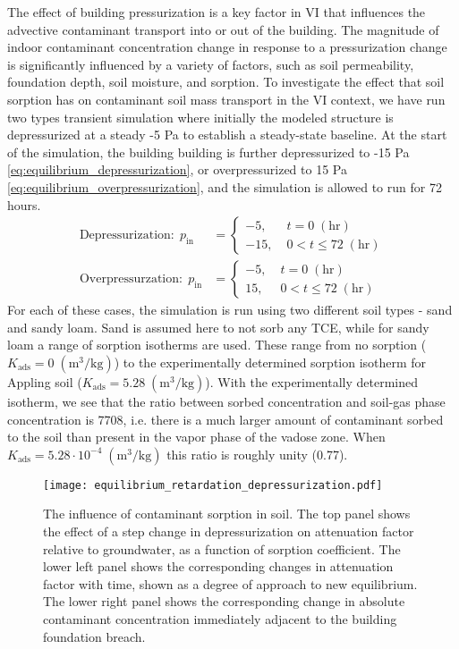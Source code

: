 The effect of building pressurization is a key factor in VI that influences the advective contaminant transport into or out of the building.
The magnitude of indoor contaminant concentration change in response to a pressurization change is significantly influenced by a variety of factors, such as soil permeability, foundation depth, soil moisture, and sorption.
To investigate the effect that soil sorption has on contaminant soil mass transport in the VI context, we have run two types transient simulation where initially the modeled structure is depressurized at a steady -5 Pa to establish a steady-state baseline.
At the start of the simulation, the building building is further depressurized to -15 Pa \eqref{eq:equilibrium_depressurization}, or overpressurized to 15 Pa \eqref{eq:equilibrium_overpressurization}, and the simulation is allowed to run for 72 hours.
\begin{align}
  \text{Depressurization}: \; p_\mathrm{in} &= \begin{cases}
    -5, \; &t = 0 \; \mathrm{(hr)} \\
    -15, \; &0 < t \leq 72 \; \mathrm{(hr)}
\end{cases}\label{eq:equilibrium_depressurization}\\
\text{Overpressurzation}: \; p_\mathrm{in} &= \begin{cases}
  -5, \; &t = 0 \; \mathrm{(hr)} \\
  15, \; &0 < t \leq 72 \; \mathrm{(hr)}
\end{cases}\label{eq:equilibrium_overpressurization}
\end{align}
For each of these cases, the simulation is run using two different soil types - sand and sandy loam.
Sand is assumed here to not sorb any TCE, while for sandy loam a range of sorption isotherms are used.
These range from no sorption ($K_\mathrm{ads} = 0 \; \mathrm{(m^3/kg)}$) to the experimentally determined sorption isotherm for Appling soil ($K_\mathrm{ads} = 5.28 \; \mathrm{(m^3/kg)}$).
With the experimentally determined isotherm, we see that the ratio between sorbed concentration and soil-gas phase concentration is 7708, i.e. there is a much larger amount of contaminant sorbed to the soil than present in the vapor phase of the vadose zone.
When $K_\mathrm{ads} = 5.28 \cdot 10^{-4} \; \mathrm{(m^3/kg)}$ this ratio is roughly unity (0.77).\par

\begin{figure}[!htb]
  \texttt{[image: equilibrium\_retardation\_depressurization.pdf]}
  \caption{The influence of contaminant sorption in soil. The top panel shows the effect of a step change in depressurization on attenuation factor relative to groundwater, as a function of sorption coefficient. The lower left panel shows the corresponding changes in attenuation factor with time, shown as a degree of approach to new equilibrium.  The lower right panel shows the corresponding change in absolute contaminant concentration immediately adjacent to the building foundation breach.}
  \label{fig:equilibrium_depressurization}
\end{figure}

